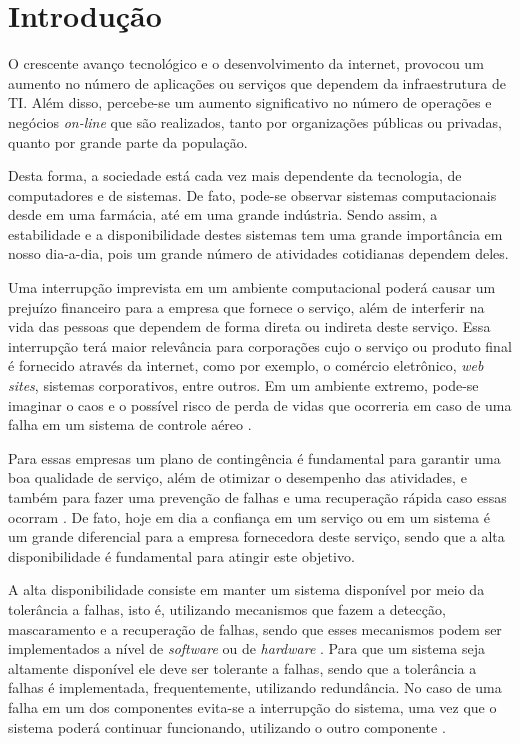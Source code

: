 \chapter{Introdução}
O crescente avanço tecnológico e o desenvolvimento da internet, provocou um aumento no número de aplicações ou serviços que dependem da 
infraestrutura de \ac{TI}. Além disso, percebe-se um aumento significativo no número de operações e negócios \textit{on-line} que são realizados, 
tanto por organizações públicas ou privadas, quanto por grande parte da população.

Desta forma, a sociedade está cada vez mais dependente da tecnologia, de computadores e de sistemas. 
De fato, pode-se observar sistemas computacionais desde em uma farmácia, até em uma grande indústria. 
Sendo assim, a estabilidade e a disponibilidade destes sistemas tem uma grande importância em nosso dia-a-dia, 
pois um grande número de atividades cotidianas dependem deles.

Uma interrupção imprevista em um ambiente computacional poderá causar um prejuízo financeiro para a empresa que fornece o serviço, 
além de interferir na vida das pessoas que dependem de forma direta ou indireta deste serviço. 
Essa interrupção terá maior relevância para corporações cujo o serviço ou produto final é fornecido através da internet, 
como por exemplo, o comércio eletrônico, \textit{web sites}, sistemas corporativos, entre outros. 
Em um ambiente extremo, pode-se imaginar o caos e o possível risco de perda de vidas que ocorreria em caso de uma falha 
em um sistema de controle aéreo \cite{costa2009}.

Para essas empresas um plano de contingência é fundamental para garantir uma boa qualidade de serviço, além de
otimizar o desempenho das atividades, e também para fazer uma prevenção de falhas e uma recuperação rápida caso essas ocorram \cite{costa2009}.
De fato, hoje em dia a confiança em um serviço ou em um sistema é um grande diferencial para a empresa fornecedora deste serviço, 
sendo que a alta disponibilidade é fundamental para atingir este objetivo.

A alta disponibilidade consiste em manter um sistema disponível por meio da tolerância a falhas, isto é, utilizando mecanismos que fazem a 
detecção, mascaramento e a recuperação de falhas, sendo que esses mecanismos podem ser implementados a nível de \textit{software} ou de 
\textit{hardware} \cite{reis2009}. Para que um sistema seja altamente disponível ele deve ser tolerante a falhas, sendo que a tolerância
a falhas é implementada, frequentemente, utilizando redundância. No caso de uma falha em um dos componentes evita-se a interrupção do sistema,
uma vez que o sistema poderá continuar funcionando, utilizando o outro componente \cite{batista2007}.

